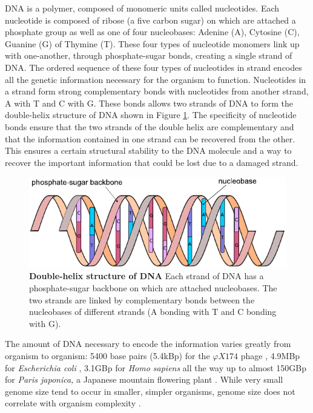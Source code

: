 \documentclass[
  11pt,
  twoside]{scrbook}
\newcommand{\extcaption}[2]{
    \caption[#1]{
        \textbf{#1}\newline
        #2
    }
}
\begin{document}
DNA is a polymer, composed of monomeric units called nucleotides. Each nucleotide is composed of ribose (a five carbon sugar) on which are attached a phosphate group as well as one of four nucleobases: Adenine (A), Cytosine (C), Guanine (G) of Thymine (T). These four types of nucleotide monomers link up with one-another, through phosphate-sugar bonds, creating a single strand of DNA. The ordered sequence of these four types of nucleotides in strand encodes all the genetic information necessary for the organism to function. Nucleotides in a strand form strong complementary bonds with nucleotides from another strand, A with T and C with G. These bonds allows two strands of DNA to form the double-helix structure of DNA \autocite{watson1953} shown in Figure \ref{fig:figDNA}. The specificity of nucleotide bonds ensure that the two strands of the double helix are complementary and that the information contained in one strand can be recovered from the other. This ensures a certain structural stability to the DNA molecule and a way to recover the important information that could be lost due to a damaged strand.

\begin{figure}[h]
\centering
\includegraphics[width=\linewidth]{./figures/Sequence-Intro/DNA.pdf}
\extcaption{Double-helix structure of DNA}{Each strand of DNA has a phosphate-sugar backbone on which are attached nucleobases. The two strands are linked by complementary bonds between the nucleobases of different strands (A bonding with T and C bonding with G).}
\label{fig:figDNA}
\end{figure}

The amount of DNA necessary to encode the information varies greatly from organism to organism: 5400 base pairs (5.4kBp) for the \(\varphi X174\) phage \autocite{sangerNucleotideSequenceBacteriophage1977}, 4.9MBp for \emph{Escherichia coli} \autocite{archer2011}, 3.1GBp for \emph{Homo sapiens} \autocite{nurk2022} all the way up to almost 150GBp for \emph{Paris japonica,} a Japanese mountain flowering plant \autocite{pellicer2010}. While very small genome size tend to occur in smaller, simpler organisms, genome size does not correlate with organism complexity \autocite{macgregor2001}.
\end{document}
